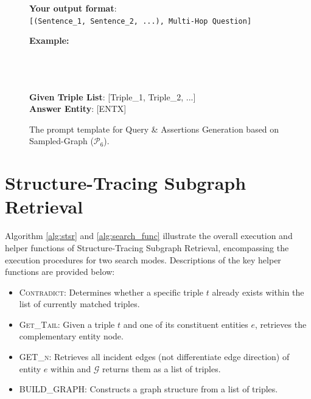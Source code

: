\documentclass[11pt]{article}
\begin{document}
\begin{figure}[H]
\begin{tcolorbox}
    \textbf{Your output format}: \\
    \texttt{[(Sentence\_1, Sentence\_2, ...), Multi-Hop Question]}

    \vspace{0.3cm}

    \textbf{Example:} \\
    \text{[EXAMPLE\_1]} \\
    \text{[EXAMPLE\_2]} \\
    \text{[EXAMPLE\_3]} \\

    \vspace{0.3cm}

    \textbf{Given Triple List}: [Triple\_1, Triple\_2, ...]\\
    \textbf{Answer Entity}: [ENTX]
    \end{tcolorbox}
    \caption{The prompt template for Query \& Assertions Generation based on Sampled-Graph ($\mathcal{P}_6$).}
    \label{fig:p6}
\end{figure}

\section{Structure-Tracing Subgraph Retrieval}
\label{sec:sstr}
Algorithm \ref{alg:stsr} and \ref{alg:search_func} illustrate the overall execution and helper functions of Structure-Tracing Subgraph Retrieval, encompassing the execution procedures for two search modes. Descriptions of the key helper functions are provided below:
\begin{itemize}
\item \textsc{Contradict}: Determines whether a specific triple $t$ already exists within the list of currently matched triples.
\item \textsc{Get\_Tail}: Given a triple $t$ and one of its constituent entities $e$, retrieves the complementary entity node.
\item \textsc{GET\_n}: Retrieves all incident edges (not differentiate edge direction) of entity $e$ within and $\mathcal{G}$ returns them as a list of triples.
\item \textsc{BUILD\_GRAPH}: Constructs a graph structure from a list of triples.
\end{itemize}
\end{document}
